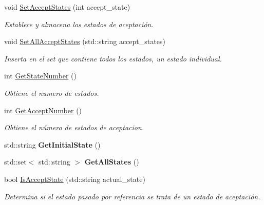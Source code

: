 \begin{DoxyCompactItemize}
\mbox{\label{classStates_ac3038ae4bc800dd96e8f71186f3badbf}} 
void \hyperlink{classStates_ac3038ae4bc800dd96e8f71186f3badbf}{Set\+Accept\+States} (int accept\+\_\+state)
\begin{DoxyCompactList}\small\item\em Establece y almacena los estados de aceptación. \end{DoxyCompactList}\item 
\mbox{\label{classStates_a69e75840154231517b78ef9e6fcedfc1}} 
void \hyperlink{classStates_a69e75840154231517b78ef9e6fcedfc1}{Set\+All\+Accept\+States} (std\+::string accept\+\_\+states)
\begin{DoxyCompactList}\small\item\em Inserta en el set que contiene todos los estados, un estado individual. \end{DoxyCompactList}\item 
\mbox{\label{classStates_a4e73e71b7f53665abbfd154b72f39d08}} 
int \hyperlink{classStates_a4e73e71b7f53665abbfd154b72f39d08}{Get\+State\+Number} ()
\begin{DoxyCompactList}\small\item\em Obtiene el numero de estados. \end{DoxyCompactList}\item 
\mbox{\label{classStates_a77328d7648bbe13bf6eada96850b444c}} 
int \hyperlink{classStates_a77328d7648bbe13bf6eada96850b444c}{Get\+Accept\+Number} ()
\begin{DoxyCompactList}\small\item\em Obtiene el número de estados de aceptacion. \end{DoxyCompactList}\item 
\mbox{\label{classStates_a91a78f6240e62c28c12c8a1a0b132c55}} 
std\+::string {\bfseries Get\+Initial\+State} ()
\item 
\mbox{\label{classStates_ab1a3da48e6dd1ecadffe23c7db057769}} 
std\+::set$<$ std\+::string $>$ {\bfseries Get\+All\+States} ()
\item 
\mbox{\label{classStates_a00c6a25604f801935f924ef5c89b3eda}} 
bool \hyperlink{classStates_a00c6a25604f801935f924ef5c89b3eda}{Is\+Accept\+State} (std\+::string actual\+\_\+state)
\begin{DoxyCompactList}\small\item\em Determina si el estado pasado por referencia se trata de un estado de aceptación. \end{DoxyCompactList}\end{DoxyCompactItemize}

